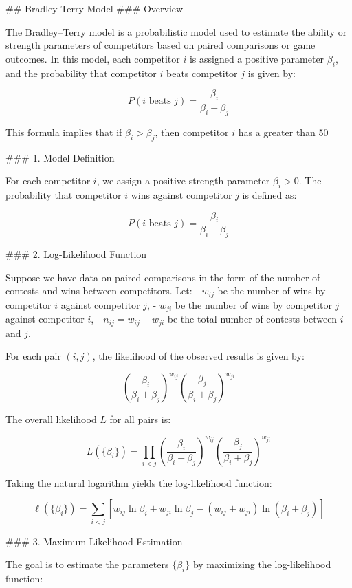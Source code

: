 ## Bradley-Terry Model
### Overview

The Bradley–Terry model is a probabilistic model used to estimate the ability or strength parameters of competitors based on paired comparisons or game outcomes. In this model, each competitor \(i\) is assigned a positive parameter \(\beta_i\), and the probability that competitor \(i\) beats competitor \(j\) is given by:

\[
P(i \text{ beats } j) = \frac{\beta_i}{\beta_i + \beta_j}
\]

This formula implies that if \(\beta_i > \beta_j\), then competitor \(i\) has a greater than 50%

### 1. Model Definition

For each competitor \(i\), we assign a positive strength parameter \(\beta_i > 0\). The probability that competitor \(i\) wins against competitor \(j\) is defined as:

\[
P(i \text{ beats } j) = \frac{\beta_i}{\beta_i + \beta_j}
\]

### 2. Log-Likelihood Function

Suppose we have data on paired comparisons in the form of the number of contests and wins between competitors. Let:
- \(w_{ij}\) be the number of wins by competitor \(i\) against competitor \(j\),
- \(w_{ji}\) be the number of wins by competitor \(j\) against competitor \(i\),
- \(n_{ij} = w_{ij} + w_{ji}\) be the total number of contests between \(i\) and \(j\).

For each pair \((i, j)\), the likelihood of the observed results is given by:

\[
\left(\frac{\beta_i}{\beta_i + \beta_j}\right)^{w_{ij}} \left(\frac{\beta_j}{\beta_i + \beta_j}\right)^{w_{ji}}
\]

The overall likelihood \(L\) for all pairs is:

\[
L(\{\beta_i\}) = \prod_{i<j} \left(\frac{\beta_i}{\beta_i + \beta_j}\right)^{w_{ij}} \left(\frac{\beta_j}{\beta_i + \beta_j}\right)^{w_{ji}}
\]

Taking the natural logarithm yields the log-likelihood function:

\[
\ell(\{\beta_i\}) = \sum_{i<j} \left[ w_{ij} \ln \beta_i + w_{ji} \ln \beta_j - (w_{ij}+w_{ji}) \ln (\beta_i + \beta_j) \right]
\]

### 3. Maximum Likelihood Estimation

The goal is to estimate the parameters \(\{\beta_i\}\) by maximizing the log-likelihood function:

